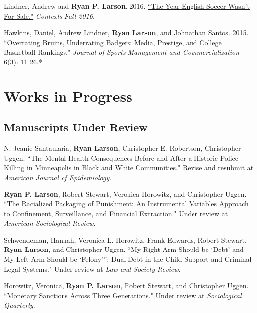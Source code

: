 \documentclass[letterpaper]{article}
\renewenvironment{itemize}{
  \begin{list}{}{
    \setlength{\leftmargin}{1.5em}
  }
}{
  \end{list}
}
\begin{document}
\begin{itemize}
\item Lindner, Andrew and \textbf{Ryan P. Larson}. 2016. \href{http://journals.sagepub.com/doi/full/10.1177/1536504216685127}{``The Year English Soccer Wasn't For Sale."} \textit{Contexts Fall 2016}. 

\item Hawkins, Daniel, Andrew Lindner, \textbf{Ryan Larson}, and Johnathan Santos. 2015. ``Overrating Bruins, Underrating Badgers: Media, Prestige, and College Basketball Rankings." \textit{Journal of Sports Management and Commercialization} 6(3): 11-26.*

\end{itemize}

\section*{\textbf{Works in Progress}}

\subsection*{Manuscripts Under Review}
\begin{itemize}

\item N. Jeanie Santaularia, \textbf{Ryan Larson}, Christopher E. Robertson, Christopher Uggen. ``The Mental Health Consequences Before and After a Historic Police Killing in Minneapolis in Black and White Communities." Revise and resubmit at \textit{American Journal of Epidemiology}. 

\item \textbf{Ryan P. Larson}, Robert Stewart, Veronica Horowitz, and Christopher Uggen. ``The Racialized Packaging of Punishment: An Instrumental Variables Approach to Confinement, Surveillance, and Financial Extraction." Under review at \textit{American Sociological Review}.

\item Schwendeman, Hannah, Veronica L. Horowitz, Frank Edwards, Robert Stewart,  \textbf{Ryan Larson}, and Christopher Uggen. ``My Right Arm Should be ‘Debt’ and My Left Arm Should be ‘Felony’”: Dual Debt in the Child Support and Criminal Legal Systems." Under review at \textit{Law and Society Review}. 

\item Horowitz, Veronica, \textbf{Ryan P. Larson}, Robert Stewart, and Christopher Uggen. ``Monetary Sanctions Across Three Generations." Under review at \textit{Sociological Quarterly}.


\end{itemize}
\end{document}
